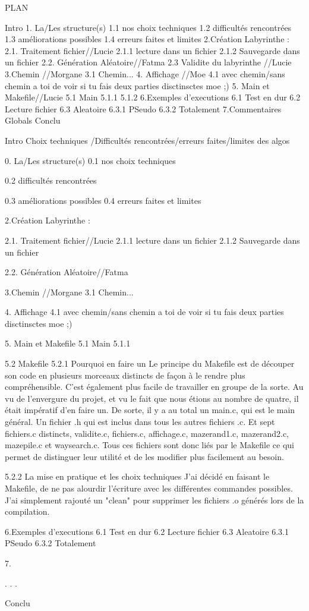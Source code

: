 PLAN

Intro
1. La/Les  structure(s)
  1.1 nos choix techniques
  1.2 difficultés rencontrées
  1.3 améliorations possibles
  1.4 erreurs faites et limites
2.Création Labyrinthe :
  2.1. Traitement fichier//Lucie
    2.1.1 lecture dans un fichier
    2.1.2 Sauvegarde dans un fichier
  2.2. Génération Aléatoire//Fatma
  2.3 Validite du labyrinthe //Lucie
3.Chemin //Morgane
  3.1 Chemin...
4. Affichage //Moe
  4.1 avec chemin/sans chemin a toi de voir si tu fais deux parties disctinsctes moe ;)
5. Main et Makefile//Lucie
  5.1 Main
    5.1.1
    5.1.2
6.Exemples d'executions
  6.1 Test en dur
  6.2 Lecture fichier
  6.3 Aleatoire
    6.3.1 PSeudo
    6.3.2 Totalement
7.Commentaires Globals
Conclu






Intro
Choix techniques /Difficultés rencontrées/erreurs faites/limites des algos


0. La/Les  structure(s)
0.1 nos choix techniques
 
0.2 difficultés rencontrées

0.3 améliorations possibles
0.4 erreurs faites et limites

2.Création Labyrinthe :

2.1. Traitement fichier//Lucie
2.1.1 lecture dans un fichier
2.1.2 Sauvegarde dans un fichier

2.2. Génération Aléatoire//Fatma

3.Chemin //Morgane
3.1 Chemin...

4. Affichage 
4.1 avec chemin/sans chemin a toi de voir si tu fais deux parties disctinsctes moe ;)

5. Main et Makefile
5.1 Main
5.1.1



5.2 Makefile
5.2.1 Pourquoi en faire un
Le principe du Makefile est de découper son code en plusieurs morceaux distincts de façon à le rendre plus compréhensible.
C'est également plus facile de travailler en groupe de la sorte. 
Au vu de l'envergure du projet, et vu le fait que nous étions au nombre de quatre, il était impératif d'en faire un. 
De sorte, il y a au total un main.c, qui est le main général. Un fichier .h qui est inclus dans tous les autres fichiers .c.  
Et sept fichiers.c distincts, validite.c, fichiers.c, affichage.c, mazerand1.c, mazerand2.c, mazepile.c et waysearch.c.
Tous ces fichiers sont donc liés par le Makefile ce qui permet de distinguer leur utilité et de les modifier plus facilement au besoin.

5.2.2 La mise en pratique et les choix techniques
J'ai décidé en faisant le Makefile, de ne pas alourdir l'écriture avec les différentes commandes possibles.
J'ai simplement rajouté un "clean" pour supprimer les fichiers .o générés lors de la compilation. 



6.Exemples d'executions
6.1 Test en dur
6.2 Lecture fichier
6.3 Aleatoire
6.3.1 PSeudo
6.3.2 Totalement

7.


.
.
.

Conclu

